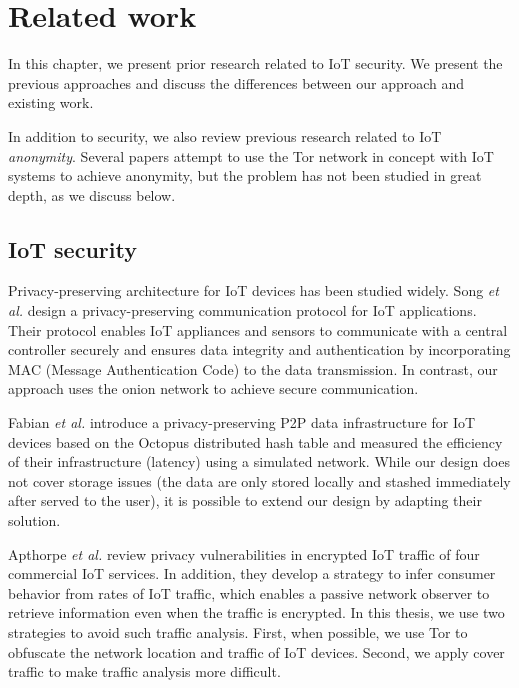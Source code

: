 \chapter{Related work}

In this chapter, we present prior research related to IoT security.  We present the previous approaches and discuss the differences between our approach and existing work.

In addition to security, we also review previous research related to IoT \textit{anonymity}. Several papers attempt to use the Tor network in concept with IoT systems to achieve anonymity, but the problem has not been studied in great depth, as we discuss below. 

\section{IoT security}

Privacy-preserving architecture for IoT devices has been studied widely. Song \textit{et al.} \cite{song2017privacy} design a privacy-preserving communication protocol for IoT applications. Their protocol enables IoT appliances and sensors to communicate with a central controller securely and ensures data integrity and authentication by incorporating MAC (Message Authentication Code) to the data transmission. In contrast, our approach uses the onion network to achieve secure communication.

Fabian \textit{et al.} \cite{fabian2014privacy} introduce a privacy-preserving P2P data infrastructure for IoT devices based on the Octopus distributed hash table \cite{wang2012octopus} and measured the efficiency of their infrastructure (latency) using a simulated network. While our design does not cover storage issues (the data are only stored locally and stashed immediately after served to the user), it is possible to extend our design by adapting their solution.

Apthorpe \textit{et al.} \cite{apthorpe2017smart} review privacy vulnerabilities in encrypted IoT traffic of four commercial IoT services. In addition, they develop a strategy to infer consumer behavior from rates of IoT traffic, which enables a passive network observer to retrieve information even when the traffic is encrypted. In this thesis, we use two strategies to avoid such traffic analysis. First, when possible, we use Tor to obfuscate the network location and traffic of IoT devices. Second, we apply cover traffic to make traffic analysis more difficult.

